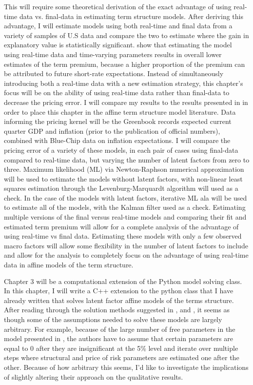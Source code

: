 \documentclass{article}
\numberwithin{equation}{section}
\begin{document}
This will require some theoretical derivation of the exact advantage of using
real-time data vs. final-data in estimating term structure models. After
deriving this advantage, I will estimate models using both real-time and final
data from a variety of samples of U.S data and compare the two to estimate
where the gain in explanatory value is statistically significant.
\citet{orphanideswei2010} show that estimating the model using real-time data
and time-varying parameters results in overall lower estimates of the term
premium, because a higher proportion of the premium can be attributed to future
short-rate expectations. Instead of simultaneously introducing both a real-time
data with a new estimation strategy, this chapter's focus will be on the
ability of using real-time data rather than final-data to decrease the pricing
error. I will compare my results to the results presented in
\citet{orphanideswei2010} in order to place this chapter in the affine term
structure model literature. Data informing the pricing kernel will be the
Greenbook records expected current quarter GDP and inflation (prior to the
publication of official numbers), combined with Blue-Chip data on inflation
expectations. I will compare the pricing error of a variety of these models, in
each pair of cases using final-data compared to real-time data, but varying the
number of latent factors from zero to three. Maximum likelihood (ML) via
Newton-Raphson numerical approximation will be used to estimate the models
without latent factors, with non-linear least squares estimation through the
Levenburg-Marquardt algorithm will used as a check. In the case of the models
with latent factors, iterative ML ala \citet{ang2003no} will be used to
estimate all of the models, with the Kalman filter used as a check. Estimating
multiple versions of the final versus real-time models and comparing their fit
and estimated term premium will allow for a complete analysis of the advantage
of using real-time vs final data. Estimating these models with only a few
observed macro factors will allow some flexibility in the number of latent
factors to include and allow for the analysis to completely focus on the
advantage of using real-time data in affine models of the term structure.

Chapter 3 will be a computational extension of the Python model solving class.
In this chapter, I will write a C++ extension to the python class that I have
already written that solves latent factor affine models of the terms structure.
After reading through the solution methods suggested in
\citet{daisingleton2000}, \citet{ang2003no} and \citet{duffee2004estimation},
it seems as though some of the assumptions needed to solve these models are
largely arbitrary. For example, because of the large number of free parameters
in the model presented in \citet{ang2003no}, the authors have to assume that
certain parameters are equal to 0 after they are insignificant at the 5\% level
and iterate over multiple steps where structural and price of risk parameters
are estimated one after the other. Because of how arbitrary this seems, I'd
like to investigate the implications of slightly altering their approach on the
qualitative results.
\end{document}
